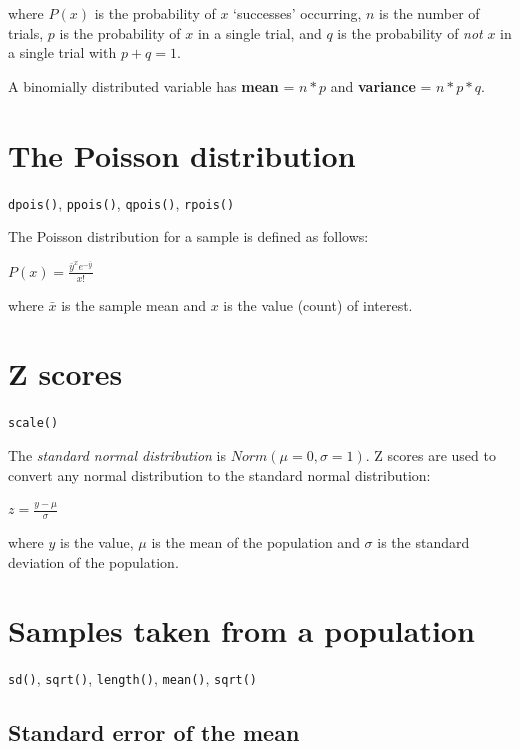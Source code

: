 \documentclass[
  11pt,
  a4paper,
]{book}
\begin{document}
where \(P(x)\) is the probability of \(x\) `successes' occurring, \(n\) is the number of trials, \(p\) is the probability of \(x\) in a single trial, and \(q\) is the probability of \emph{not} \(x\) in a single trial with \(p+q=1\).

A binomially distributed variable has \textbf{mean} = \(n*p\) and \textbf{variance} = \(n*p*q\).

\hypertarget{the-poisson-distribution-1}{%
\section{The Poisson distribution}\label{the-poisson-distribution-1}}

\texttt{dpois()}, \texttt{ppois()}, \texttt{qpois()}, \texttt{rpois()}

The Poisson distribution for a sample is defined as follows:

\(P(x) = \frac{\bar{y}^x e^{-\bar{y}}}{x!}\)

where \(\bar{x}\) is the sample mean and \(x\) is the value (count) of interest.

\hypertarget{z-scores}{%
\section{Z scores}\label{z-scores}}

\texttt{scale()}

The \emph{standard normal distribution} is \(Norm(\mu=0, \sigma=1)\). Z scores are used to convert any normal distribution to the standard normal distribution:

\(z = \frac{y-\mu}{\sigma}\)

where \(y\) is the value, \(\mu\) is the mean of the population and \(\sigma\) is the standard deviation of the population.

\hypertarget{samples-taken-from-a-population}{%
\section{Samples taken from a population}\label{samples-taken-from-a-population}}

\texttt{sd()}, \texttt{sqrt()}, \texttt{length()}, \texttt{mean()}, \texttt{sqrt()}

\hypertarget{standard-error-of-the-mean}{%
\subsection{Standard error of the mean}\label{standard-error-of-the-mean}}
\end{document}
